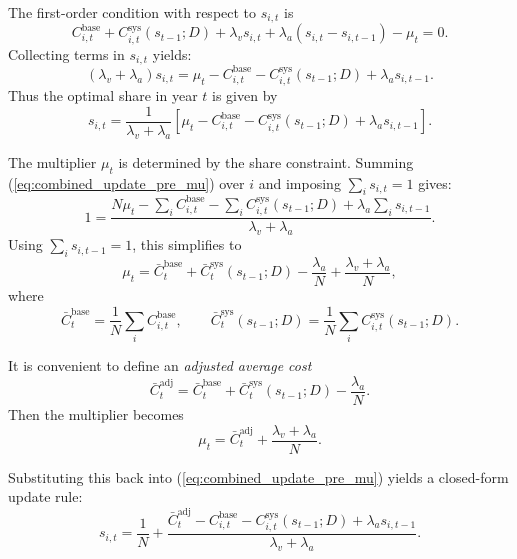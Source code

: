 \documentclass[preprint,authoryear,12pt]{elsarticle}
\begin{document}
The first-order condition with respect to $s_{i,t}$ is
\begin{equation}
    C_{i,t}^{\text{base}} + C_{i,t}^{\text{sys}}(s_{t-1};D)
    + \lambda_v s_{i,t}
    + \lambda_a (s_{i,t} - s_{i,t-1})
    - \mu_t = 0.
\end{equation}
Collecting terms in $s_{i,t}$ yields:
\begin{equation}
    (\lambda_v + \lambda_a) s_{i,t}
    = \mu_t
      - C_{i,t}^{\text{base}}
      - C_{i,t}^{\text{sys}}(s_{t-1};D)
      + \lambda_a s_{i,t-1}.
    \label{eq:combined_foc}
\end{equation}
Thus the optimal share in year $t$ is given by
\begin{equation}
    s_{i,t}
    = \frac{1}{\lambda_v + \lambda_a}
      \left[
          \mu_t
        - C_{i,t}^{\text{base}}
        - C_{i,t}^{\text{sys}}(s_{t-1};D)
        + \lambda_a s_{i,t-1}
      \right].
    \label{eq:combined_update_pre_mu}
\end{equation}

The multiplier $\mu_t$ is determined by the share constraint. Summing
(\ref{eq:combined_update_pre_mu}) over $i$ and imposing $\sum_i s_{i,t} = 1$ gives:
\begin{equation}
    1
    = \frac{N \mu_t
        - \sum_i C_{i,t}^{\text{base}}
        - \sum_i C_{i,t}^{\text{sys}}(s_{t-1};D)
        + \lambda_a \sum_i s_{i,t-1}
      }{\lambda_v + \lambda_a}.
\end{equation}
Using $\sum_i s_{i,t-1} = 1$, this simplifies to
\begin{equation}
    \mu_t
    = \bar{C}_t^{\text{base}}
      + \bar{C}_t^{\text{sys}}(s_{t-1};D)
      - \frac{\lambda_a}{N}
      + \frac{\lambda_v + \lambda_a}{N},
\end{equation}
where
\[
    \bar{C}_t^{\text{base}} = \frac{1}{N} \sum_i C_{i,t}^{\text{base}}, 
    \qquad
    \bar{C}_t^{\text{sys}}(s_{t-1};D) = \frac{1}{N} \sum_i C_{i,t}^{\text{sys}}(s_{t-1};D).
\]

It is convenient to define an \emph{adjusted average cost}
\begin{equation}
    \bar{C}_t^{\text{adj}}
    = \bar{C}_t^{\text{base}} + \bar{C}_t^{\text{sys}}(s_{t-1};D) - \frac{\lambda_a}{N}.
\end{equation}
Then the multiplier becomes
\begin{equation}
    \mu_t = \bar{C}_t^{\text{adj}} + \frac{\lambda_v + \lambda_a}{N}.
\end{equation}

Substituting this back into (\ref{eq:combined_update_pre_mu}) yields a closed-form update rule:
\begin{equation}
    s_{i,t}
    = \frac{1}{N}
      + \frac{
            \bar{C}_t^{\text{adj}}
          - C_{i,t}^{\text{base}}
          - C_{i,t}^{\text{sys}}(s_{t-1};D)
          + \lambda_a s_{i,t-1}
        }{\lambda_v + \lambda_a}.
    \label{eq:combined_update_final}
\end{equation}
\end{document}

